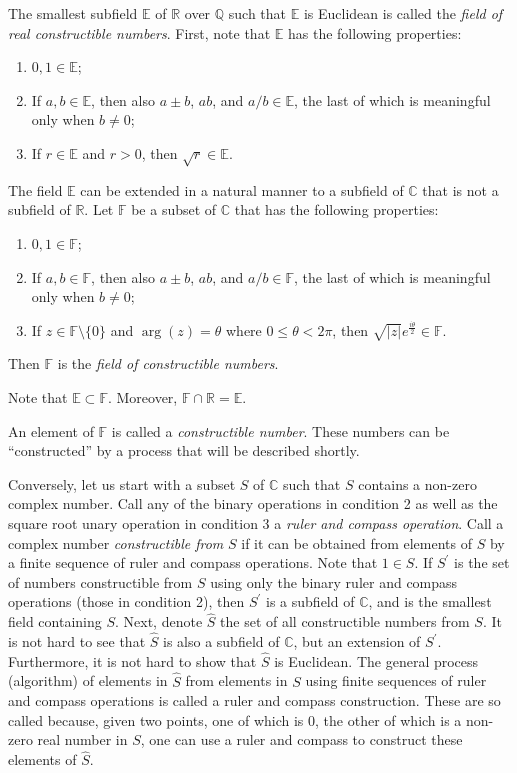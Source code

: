 \documentclass[12pt]{article}
\begin{document}
The smallest subfield $\mathbb{E}$ of $\mathbb{R}$ over $\mathbb{Q}$ such that $\mathbb{E}$ is 
Euclidean is called the \emph{field of real constructible numbers}.  First, note that $\mathbb{E}$ has the following properties:

\begin{enumerate}
\item $0,1\in\mathbb{E}$;
\item If $a,b\in\mathbb{E}$, then also $a\pm b$, $ab$, and $a/b\in\mathbb{E}$, the last of which is meaningful only when $b\not=0$;
\item If $r\in\mathbb{E}$ and $r>0$, then $\sqrt{r}\in\mathbb{E}$.
\end{enumerate}

The field $\mathbb{E}$ can be extended in a natural manner to a subfield of $\mathbb{C}$ that is not a subfield of $\mathbb{R}$.  Let $\mathbb{F}$ be a subset of $\mathbb{C}$ that has the following properties:

\begin{enumerate}
\item $0,1\in\mathbb{F}$;
\item If $a,b\in\mathbb{F}$, then also $a\pm b$, $ab$, and $a/b\in\mathbb{F}$, the last of which is meaningful only when $b\not=0$;
\item If $z\in\mathbb{F} \setminus \{0\}$ and $\operatorname{arg}(z)=\theta$ where $0 \le \theta < 2\pi$, then $\sqrt{|z|}e^{\frac{i\theta}{2}}\in\mathbb{F}$.
\end{enumerate}

Then $\mathbb{F}$ is the \emph{field of constructible numbers}.

Note that $\mathbb{E}\subset\mathbb{F}$.  Moreover, $\mathbb{F}\cap\mathbb{R}=\mathbb{E}$.

An element of $\mathbb{F}$ is called a \emph{constructible number}.  These numbers can be ``constructed'' by a process that will be described shortly.

Conversely, let us start with a subset $S$ of $\mathbb{C}$ such that $S$ contains a non-zero complex number.  Call any of the binary operations in condition 2 as well as the square root unary operation in condition 3 a \emph{ruler and compass operation}.  Call a complex number \emph{constructible from} $S$ if it can be obtained from elements of $S$ by a finite sequence of ruler and compass operations.  Note that $1\in S$.  If $S^{\prime}$ is the set of numbers constructible from $S$ using only the binary ruler and compass operations (those in condition 2), then $S^{\prime}$ is a subfield of $\mathbb{C}$, and is the smallest field containing $S$.  Next, denote $\hat{S}$ the set of all constructible numbers from $S$.  It is not hard to see that $\hat{S}$ is also a subfield of $\mathbb{C}$, but an extension of $S^{\prime}$.  Furthermore, it is not hard to show that $\hat{S}$ is Euclidean.  The general process (algorithm) of  elements in $\hat{S}$ from elements in $S$ using finite sequences of ruler and compass operations is called a ruler and compass construction.  These are so called because, given two points, one of which is 0, the other of which is a non-zero real number in $S$, one can use a ruler and compass to construct these elements of $\hat{S}$.
\end{document}
